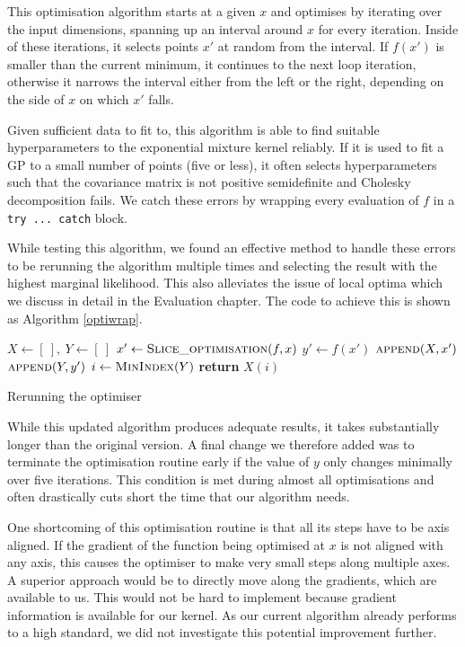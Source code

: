 \documentclass[a4paper,12pt,twoside,openright]{report}
\begin{document}
This optimisation algorithm starts at a given $x$ and optimises by iterating over the input dimensions, spanning up an interval around $x$ for every iteration. Inside of these iterations, it selects points $x'$ at random from the interval. If $f(x')$ is smaller than the current minimum, it continues to the next loop iteration, otherwise it narrows the interval either from the left or the right, depending on the side of $x$ on which $x'$ falls.

Given sufficient data to fit to, this algorithm is able to find suitable hyperparameters to the exponential mixture kernel reliably. If it is used to fit a GP to a small number of points (five or less), it often selects hyperparameters such that the covariance matrix is not positive semidefinite and Cholesky decomposition fails. We catch these errors by wrapping every evaluation of $f$ in a \texttt{try ... catch} block. 

While testing this algorithm, we found an effective method to handle these errors to be rerunning the algorithm multiple times and selecting the result with the highest marginal likelihood. This also alleviates the issue of local optima which we discuss in detail in the Evaluation chapter. The code to achieve this is shown as Algorithm \ref{optiwrap}.

\begin{algorithm}
\begin{algorithmic}[1]
\State $X \gets [\ ],\ Y \gets [\ ]$
\State $x'\gets \Call{Slice\_optimisation}{f, x}$
\State $y'\gets f(x')$
\State $\Call{append}{X, x'}$
\State $\Call{append}{Y, y'}$
\EndFor
\State $i\gets \Call{MinIndex}{Y}$
\State \textbf{return} $X(i)$
\EndProcedure
\end{algorithmic}
\caption{Rerunning the optimiser}
\label{optiwrap}
\end{algorithm}

While this updated algorithm produces adequate results, it takes substantially longer than the original version. A final change we therefore added was to terminate the optimisation routine early if the value of $y$ only changes minimally over five iterations. This condition is met during almost all optimisations and often drastically cuts short the time that our algorithm needs.

One shortcoming of this optimisation routine is that all its steps have to be axis aligned. If the gradient of the function being optimised at $x$ is not aligned with any axis, this causes the optimiser to make very small steps along multiple axes. A superior approach would be to directly move along the gradients, which are available to us. This would not be hard to implement because gradient information is available for our kernel. As our current algorithm already performs to a high standard, we did not investigate this potential improvement further.
\end{document}
